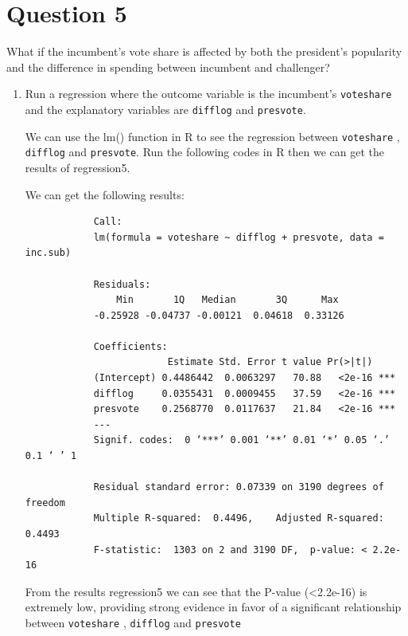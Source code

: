 \documentclass[12pt,letterpaper]{article}
\begin{document}
	\newpage	

\section*{Question 5}
\noindent What if the incumbent's vote share is affected by both the president's popularity and the difference in spending between incumbent and challenger? 
	\begin{enumerate}
		\item Run a regression where the outcome variable is the incumbent's \texttt{voteshare} and the explanatory variables are \texttt{difflog} and \texttt{presvote}.	\vspace{.15cm}
		
		\noindent  We can use the lm() function in R to see the regression between \texttt{voteshare} , \texttt{difflog} and \texttt{presvote}. Run the following codes in R then we can get the results of regression5.	\vspace{.15cm}
		
		
		
		\noindent We can get the following results: \vspace{.15cm}
		\begin{verbatim}
			Call:
			lm(formula = voteshare ~ difflog + presvote, data = inc.sub)
			
			Residuals: 
			    Min       1Q   Median       3Q      Max 
			-0.25928 -0.04737 -0.00121  0.04618  0.33126 
			
			Coefficients:
			             Estimate Std. Error t value Pr(>|t|)    
			(Intercept) 0.4486442  0.0063297   70.88   <2e-16 ***
			difflog     0.0355431  0.0009455   37.59   <2e-16 ***
			presvote    0.2568770  0.0117637   21.84   <2e-16 ***
			---
			Signif. codes:  0 ‘***’ 0.001 ‘**’ 0.01 ‘*’ 0.05 ‘.’ 0.1 ‘ ’ 1
			
			Residual standard error: 0.07339 on 3190 degrees of freedom
			Multiple R-squared:  0.4496,	Adjusted R-squared:  0.4493 
			F-statistic:  1303 on 2 and 3190 DF,  p-value: < 2.2e-16
		\end{verbatim}
		\vspace{.15cm}
		
		\noindent From the results regression5 we can see that the P-value (\textless 2.2e-16) is extremely low, providing strong evidence in favor of a significant relationship between \texttt{voteshare} , \texttt{difflog} and \texttt{presvote}\\ \vspace{.15cm}
		

\end{enumerate}
\end{document}

